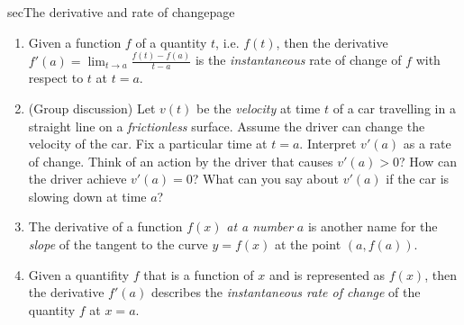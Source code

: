 \documentclass[../main]{subfiles}
\begin{document}
\begin{outline}{sec}{The derivative and rate of change}{page}
\begin{enumerate}
      \begin{enumerate}
        \item What is another word for ``rate of change in distance?''
        \item Assume \(t_{1} < t_{2}\).  For each of the condition below, describe the displacement of the balloon at time \(t_{2}\) relative to its displacement at time \(t_{1}\).
          \[
            \frac{h(t_{2}) - h(t_{1})}{t_{2} - t_{1}} > 0, 
            \hspace{2em}
            \frac{h(t_{2}) - h(t_{1})}{t_{2} - t_{1}} = 0, 
            \hspace{2em}
            \frac{h(t_{2}) - h(t_{1})}{t_{2} - t_{1}} < 0.
          \]
      \end{enumerate}
  \item Given a function \(f\) of a quantity \(t\), i.e. \(f(t)\), then the derivative \(f'(a) = {\lim_{t \to a}}\frac{f(t) - f(a)}{t - a}\) is the \emph{instantaneous} rate of change of \(f\) with respect to \(t\) at \(t = a\).
    \item[\faComments{}] (Group discussion) Let \(v(t)\) be the \emph{velocity} at time \(t\) of a car travelling in a straight line on a \emph{frictionless} surface. Assume the driver can change the velocity of the car. Fix a particular time at \(t = a\). Interpret \(v'(a)\) as a rate of change. Think of an action by the driver that causes \(v'(a) > 0\)?  How can the driver achieve \(v'(a) = 0\)?  What can you say about \(v'(a)\) if the car is slowing down at time \(a\)?
    \item {The derivative of a function \(f(x)\) \emph{at a number} \(a\) is another name for the \emph{slope} of the tangent to the curve \(y = f(x)\) at the point \((a, f(a))\).}
    \item {Given a quantifity \(f\) that is a function of \(x\) and is represented as \(f(x)\), then the derivative \(f'(a)\) describes the \emph{instantaneous rate of change} of the quantity \(f\) at \(x = a\).}
  \end{enumerate}
\end{outline}
\end{document}
